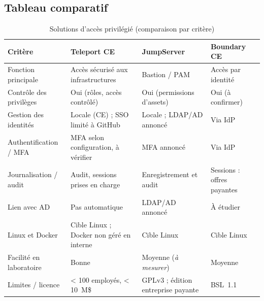 \documentclass[11pt,a4paper]{report}
\newcommand{\amesurer}{\emph{à mesurer}}
\begin{document}
\subsection{Tableau comparatif}
\footnotesize
\begin{longtable}{@{}p{}p{}p{}p{}@{}}
\caption{Solutions d'accès privilégié (comparaison par critère)}\\
\toprule\textbf{Critère} & \textbf{Teleport CE} & \textbf{JumpServer} & \textbf{Boundary CE}\\ \midrule\endhead
Fonction principale & Accès sécurisé aux infrastructures & Bastion / PAM & Accès par identité\\
Contrôle des privilèges & Oui (rôles, accès contrôlé) & Oui (permissions d'assets) & Oui (à confirmer)\\
Gestion des identités & Locale (CE) ; SSO limité à GitHub & Locale ; LDAP/AD annoncé & Via IdP\\
Authentification / MFA & MFA selon configuration, à vérifier & MFA annoncé & Via IdP\\
Journalisation / audit & Audit, sessions prises en charge & Enregistrement et audit & Sessions : offres payantes~\cite{swi}\\
Lien avec AD & Pas automatique & LDAP/AD annoncé & À étudier\\
Linux et Docker & Cible Linux ; Docker non géré en interne & Cible Linux & Cible Linux\\
Facilité en laboratoire & Bonne & Moyenne (\amesurer) & Moyenne\\
Limites / licence & < 100 employés, < 10~M\$~\cite{tp-licence} & GPLv3 ; édition entreprise payante & BSL~1.1\\
\bottomrule
\end{longtable}
\end{document}
